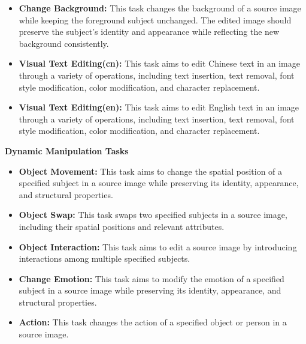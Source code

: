 \begin{itemize}[leftmargin=2.2em, labelsep=0.4em, itemsep=2pt]
    \item \textbf{Change Background: } This task changes the background of a source image while keeping the foreground subject unchanged. The edited image should preserve the subject’s identity and appearance while reflecting the new background consistently.
    \item \textbf{Visual Text Editing(cn):}  This task aims to edit Chinese text in an image through a variety of operations, including text insertion, text removal, font style modification, color modification, and character replacement.
    \item \textbf{Visual Text Editing(en): } This task aims to edit English text in an image through a variety of operations, including text insertion, text removal, font style modification, color modification, and character replacement.
\end{itemize}

\textbf{Dynamic Manipulation Tasks}
\begin{itemize}[leftmargin=2.2em, labelsep=0.4em, itemsep=2pt]
    \item \textbf{Object Movement:}  This task aims to change the spatial position of a specified subject in a source image while preserving its identity, appearance, and structural properties.
    \item \textbf{Object Swap: } This task swaps two specified subjects in a source image, including their spatial positions and relevant attributes.
    \item \textbf{Object Interaction: } This task aims to edit a source image by introducing interactions among multiple specified subjects.
    \item \textbf{Change Emotion: } This task aims to modify the emotion of a specified subject in a source image while preserving its identity, appearance, and structural properties.  
    \item \textbf{Action: } This task changes the action of a specified object or person in a source image.
\end{itemize}

